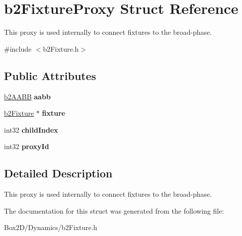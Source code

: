 \hypertarget{structb2_fixture_proxy}{}\section{b2\+Fixture\+Proxy Struct Reference}
\label{structb2_fixture_proxy}


This proxy is used internally to connect fixtures to the broad-\/phase.  




{\ttfamily \#include $<$b2\+Fixture.\+h$>$}

\subsection*{Public Attributes}
\begin{DoxyCompactItemize}
\item 
\mbox{\label{structb2_fixture_proxy_ad8950f61ce28cfa5b676065d4d843da7}} 
\hyperlink{structb2_a_a_b_b}{b2\+A\+A\+BB} {\bfseries aabb}
\item 
\mbox{\label{structb2_fixture_proxy_a3a0842dc9699c25658548c2005d0ef62}} 
\hyperlink{classb2_fixture}{b2\+Fixture} $\ast$ {\bfseries fixture}
\item 
\mbox{\label{structb2_fixture_proxy_a2edb15552cf71f48dacc3608bb134166}} 
int32 {\bfseries child\+Index}
\item 
\mbox{\label{structb2_fixture_proxy_aa0ca7e71341368fe6c6913fb39c7283b}} 
int32 {\bfseries proxy\+Id}
\end{DoxyCompactItemize}


\subsection{Detailed Description}
This proxy is used internally to connect fixtures to the broad-\/phase. 

The documentation for this struct was generated from the following file\+:\begin{DoxyCompactItemize}
\item 
Box2\+D/\+Dynamics/b2\+Fixture.\+h\end{DoxyCompactItemize}
